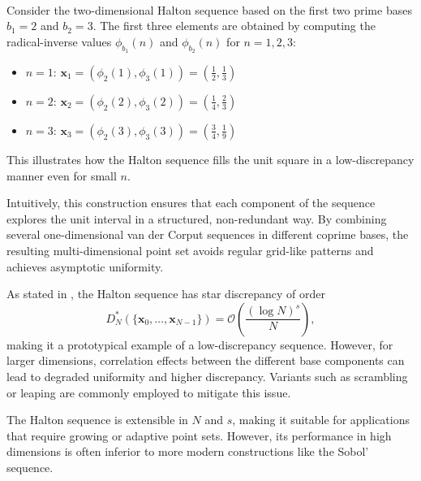 \begin{example} \ \\
Consider the two-dimensional Halton sequence based on the first two prime bases $b_1 = 2$ and $b_2 = 3$. The first three elements are obtained by computing the radical-inverse values $\phi_{b_1}(n)$ and $\phi_{b_2}(n)$ for $n = 1, 2, 3$:

\begin{itemize}
    \item $n = 1$: $\boldsymbol{x}_1 = \left( \phi_2(1), \phi_3(1) \right) = \left( \tfrac{1}{2}, \tfrac{1}{3} \right)$
    \item $n = 2$: $\boldsymbol{x}_2 = \left( \phi_2(2), \phi_3(2) \right) = \left( \tfrac{1}{4}, \tfrac{2}{3} \right)$
    \item $n = 3$: $\boldsymbol{x}_3 = \left( \phi_2(3), \phi_3(3) \right) = \left( \tfrac{3}{4}, \tfrac{1}{9} \right)$
\end{itemize}

This illustrates how the Halton sequence fills the unit square in a low-discrepancy manner even for small $n$.
\end{example}








Intuitively, this construction ensures that each component of the sequence
explores the unit interval in a structured, non-redundant way. By combining
several one-dimensional van der Corput sequences in different coprime bases, the
resulting multi-dimensional point set avoids regular grid-like patterns and
achieves asymptotic uniformity.

As stated in \cite{pillichshammer2010zahlentheoretische}, the Halton sequence
has star discrepancy of order
\begin{equation*}
    D_N^*(\{\boldsymbol{x}_0, \dots, \boldsymbol{x}_{N-1}\}) = \mathcal{O}\left( \frac{(\log N)^s}{N} \right),
\end{equation*}
making it a prototypical example of a low-discrepancy sequence. However, for
larger dimensions, correlation effects between the different base components can
lead to degraded uniformity and higher discrepancy. Variants such as scrambling
or leaping are commonly employed to mitigate this issue.

\begin{remark}
The Halton sequence is extensible in $N$ and $s$, making it suitable for
applications that require growing or adaptive point sets. However, its
performance in high dimensions is often inferior to more modern constructions
like the Sobol' sequence.
\end{remark}



